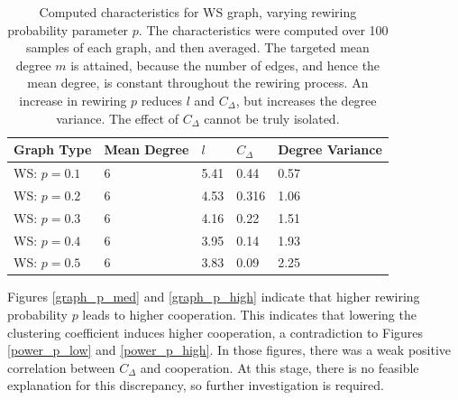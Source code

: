 \FloatBarrier
\begin{table}[!h]
\begin{center}
\begin{tabular}{|l|l|l|l|l|}
\hline
Graph Type & Mean Degree & $l$ & $C_\Delta$ & Degree Variance \\ \hline
WS: $p=0.1$        & 6        & 5.41                         & 0.44                  & 0.57           \\ \hline
WS: $p=0.2$        &6           & 4.53                         & 0.316                   & 1.06               \\ \hline
WS: $p=0.3$        &6           & 4.16                         & 0.22                   & 1.51               \\ \hline
WS: $p=0.4$       & 6        & 3.95                         & 0.14                  & 1.93           \\ \hline
WS: $p=0.5$         & 6           & 3.83                         & 0.09                   & 2.25            \\ \hline
\end{tabular}
\caption{Computed characteristics for WS graph, varying rewiring probability parameter $p$. The characteristics were computed over 100 samples of each graph, and then averaged. The targeted mean degree $m$ is attained, because the number of edges, and hence the mean degree, is constant throughout the rewiring process. An increase in rewiring $p$ reduces $l$ and $C_\Delta$, but increases the degree variance. The effect of $C_\Delta$ cannot be truly isolated. } \label{graph_stats_WS}
\end{center}
\end{table}
\FloatBarrier

\FloatBarrier
{}
\FloatBarrier
Figures \ref{graph_p_med} and \ref{graph_p_high} indicate that higher rewiring probability $p$ leads to higher cooperation. This indicates that lowering the clustering coefficient induces higher cooperation, a contradiction to Figures \ref{power_p_low} and \ref{power_p_high}. In those figures, there was a weak positive correlation between $C_\Delta$ and cooperation. At this stage, there is no feasible explanation for this discrepancy, so further investigation is required. \\

